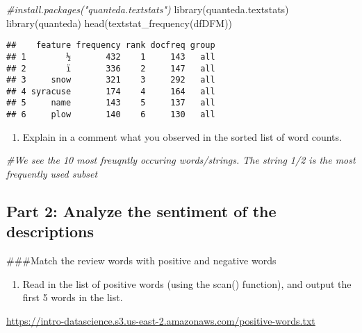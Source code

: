 \documentclass[
]{article}
\newenvironment{Shaded}{\begin{snugshade}}{\end{snugshade}}
\newcommand{\CommentTok}[1]{\textcolor[rgb]{0.56,0.35,0.01}{\textit{#1}}}
\newcommand{\FunctionTok}[1]{\textcolor[rgb]{0.00,0.00,0.00}{#1}}
\newcommand{\NormalTok}[1]{#1}
\providecommand{\tightlist}{%
  \setlength{\itemsep}{0pt}\setlength{\parskip}{0pt}}
\begin{document}
\begin{Shaded}
\begin{Highlighting}[]
\CommentTok{\#install.packages("quanteda.textstats")}
\FunctionTok{library}\NormalTok{(quanteda.textstats)}
\FunctionTok{library}\NormalTok{(quanteda)}
\FunctionTok{head}\NormalTok{(}\FunctionTok{textstat\_frequency}\NormalTok{(dfDFM))}
\end{Highlighting}
\end{Shaded}

\begin{verbatim}
##    feature frequency rank docfreq group
## 1        ½       432    1     143   all
## 2        ï       336    2     147   all
## 3     snow       321    3     292   all
## 4 syracuse       174    4     164   all
## 5     name       143    5     137   all
## 6     plow       140    6     130   all
\end{verbatim}

\begin{enumerate}
\def\labelenumi{\Alph{enumi}.}
\setcounter{enumi}{7}
\tightlist
\item
  Explain in a comment what you observed in the sorted list of word
  counts.
\end{enumerate}

\begin{Shaded}
\begin{Highlighting}[]
\CommentTok{\#We see the 10 most freuqntly occuring words/strings. The string \textquotesingle{}1/2\textquotesingle{} is the most frequently used subset}
\end{Highlighting}
\end{Shaded}

\hypertarget{part-2-analyze-the-sentiment-of-the-descriptions}{%
\subsection{Part 2: Analyze the sentiment of the
descriptions}\label{part-2-analyze-the-sentiment-of-the-descriptions}}

\#\#\#Match the review words with positive and negative words

\begin{enumerate}
\def\labelenumi{\Roman{enumi}.}
\tightlist
\item
  Read in the list of positive words (using the scan() function), and
  output the first 5 words in the list.
\end{enumerate}

\url{https://intro-datascience.s3.us-east-2.amazonaws.com/positive-words.txt}
\end{document}
